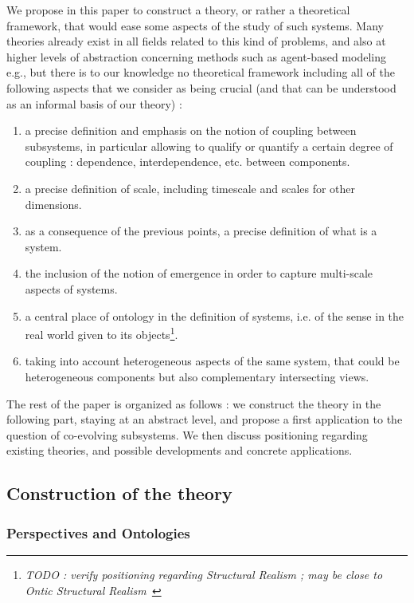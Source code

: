 We propose in this paper to construct a theory, or rather a theoretical framework, that would ease some aspects of the study of such systems. Many theories already exist in all fields related to this kind of problems, and also at higher levels of abstraction concerning methods such as agent-based modeling e.g., but there is to our knowledge no theoretical framework including all of the following aspects that we consider as being crucial (and that can be understood as an informal basis of our theory) :
\begin{enumerate}
\item a precise definition and emphasis on the notion of coupling between subsystems, in particular allowing to qualify or quantify a certain degree of coupling : dependence, interdependence, etc. between components.
\item a precise definition of scale, including timescale and scales for other dimensions.
\item as a consequence of the previous points, a precise definition of what is a system.
\item the inclusion of the notion of emergence in order to capture multi-scale aspects of systems.
\item a central place of ontology in the definition of systems, i.e. of the sense in the real world given to its objects\footnote{\textit{TODO : verify positioning regarding Structural Realism ; may be close to Ontic Structural Realism~\cite{frigg2011everything}}
}.
\item taking into account heterogeneous aspects of the same system, that could be heterogeneous components but also complementary intersecting views.
\end{enumerate}


The rest of the paper is organized as follows : we construct the theory in the following part, staying at an abstract level, and propose a first application to the question of co-evolving subsystems. We then discuss positioning regarding existing theories, and possible developments and concrete applications.


\subsection*{Construction of the theory}

\subsubsection*{Perspectives and Ontologies}

